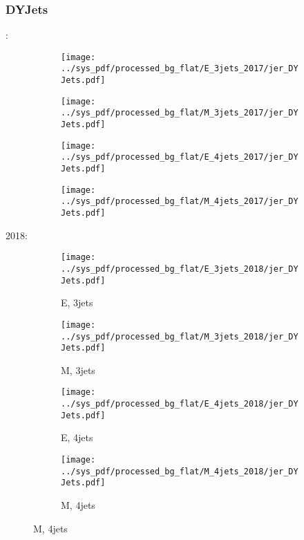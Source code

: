 \documentclass{beamer}
\begin{document}
\begin{frame}
\frametitle{DYJets}
\fontsize{5}{1}:
\begin{figure}
\centering
\begin{subfigure}[b]{0.24\textwidth}
\texttt{[image: ../sys\_pdf/processed\_bg\_flat/E\_3jets\_2017/jer\_DYJets.pdf]}
\end{subfigure}
\begin{subfigure}[b]{0.24\textwidth}
\texttt{[image: ../sys\_pdf/processed\_bg\_flat/M\_3jets\_2017/jer\_DYJets.pdf]}
\end{subfigure}
\begin{subfigure}[b]{0.24\textwidth}
\texttt{[image: ../sys\_pdf/processed\_bg\_flat/E\_4jets\_2017/jer\_DYJets.pdf]}
\end{subfigure}
\begin{subfigure}[b]{0.24\textwidth}
\texttt{[image: ../sys\_pdf/processed\_bg\_flat/M\_4jets\_2017/jer\_DYJets.pdf]}
\end{subfigure}
\end{figure}
2018:
\begin{figure}
\centering
\begin{subfigure}[b]{0.24\textwidth}
\texttt{[image: ../sys\_pdf/processed\_bg\_flat/E\_3jets\_2018/jer\_DYJets.pdf]}
\captionsetup{font=tiny}
\caption{E, 3jets}
\end{subfigure}
\begin{subfigure}[b]{0.24\textwidth}
\texttt{[image: ../sys\_pdf/processed\_bg\_flat/M\_3jets\_2018/jer\_DYJets.pdf]}
\captionsetup{font=tiny}
\caption{M, 3jets}
\end{subfigure}
\begin{subfigure}[b]{0.24\textwidth}
\texttt{[image: ../sys\_pdf/processed\_bg\_flat/E\_4jets\_2018/jer\_DYJets.pdf]}
\captionsetup{font=tiny}
\caption{E, 4jets}
\end{subfigure}
\begin{subfigure}[b]{0.24\textwidth}
\texttt{[image: ../sys\_pdf/processed\_bg\_flat/M\_4jets\_2018/jer\_DYJets.pdf]}
\captionsetup{font=tiny}
\caption{M, 4jets}
\end{subfigure}
\end{figure}
\end{frame}
\end{document}
